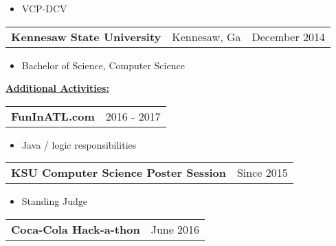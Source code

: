 \documentclass{book}
\newenvironment{myitemize}
{ \begin{itemize}
	\setlength{\itemsep}{0pt}
	\setlength{\parskip}{0pt}
	\setlength{\parsep}{0pt}     }
{ \end{itemize}                  }
\begin{document}
	\begin{myitemize}
		\item VCP-DCV
	\end{myitemize} 

\begin{tabular}{L{3in}L{1.75in}R{1.75in}}

	{\large {\bfseries Kennesaw State University}} & Kennesaw, Ga & December 2014 \\%

\end{tabular}

\begin{myitemize}

	\item Bachelor of Science, Computer Science 

\end{myitemize}

\underline{\Large {\bfseries Additional Activities:}}

\enspace

\begin{tabular}{L{4.75in}R{1.75in}}

	{\large {\bfseries FunInATL.com}} & 2016 - 2017\\

\end{tabular}

	\vspace{-\topsep}
	\begin{myitemize}

		\item Java / logic responsibilities

	\end{myitemize} 

\begin{tabular}{L{4.75in}R{1.75in}}

	{\large {\bfseries KSU Computer Science Poster Session}} & Since 2015 \\

\end{tabular}

	\vspace{-\topsep}
	\begin{myitemize}

		\item Standing Judge

	\end{myitemize} 

\begin{tabular}{L{4.75in}R{1.75in}}

	{\large {\bfseries Coca-Cola Hack-a-thon}} & June 2016 \\

\end{tabular}
\end{document}
